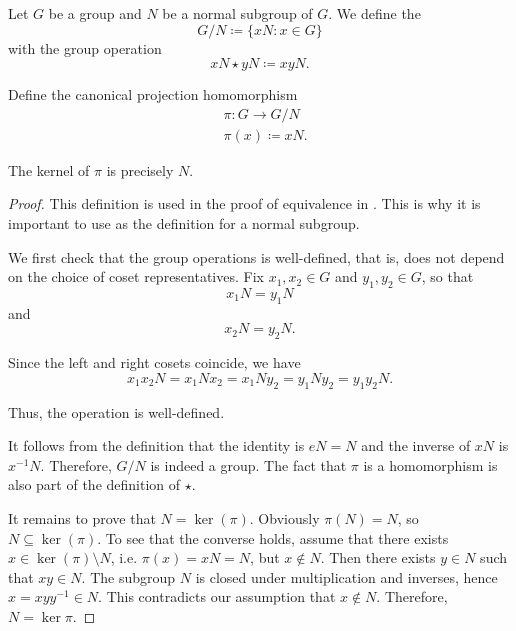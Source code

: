 \begin{definition}\label{def:quotient_group}
  Let \( G \) be a group and \( N \) be a normal subgroup of \( G \). We define the 
  \begin{equation*}
    G / N \coloneqq \{ x N \colon x \in G \}
  \end{equation*}
  with the group operation
  \begin{equation*}
    x N \star y N \coloneqq xy N.
  \end{equation*}

  Define the canonical projection homomorphism
  \begin{align*}
    &\pi: G \to G / N \\
    &\pi(x) \coloneqq x N.
  \end{align*}

  The kernel of \( \pi \) is precisely \( N \).
\end{definition}
\begin{proof}
  This definition is used in the proof of equivalence in . This is why it is important to use  as the definition for a normal subgroup.

  We first check that the group operations is well-defined, that is, does not depend on the choice of coset representatives. Fix \( x_1, x_2 \in G \) and \( y_1, y_2 \in G \), so that
  \begin{equation*}
    x_1 N = y_1 N
  \end{equation*}
  and
  \begin{equation*}
    x_2 N = y_2 N.
  \end{equation*}

  Since the left and right cosets coincide, we have
  \begin{equation*}
    x_1 x_2 N = x_1 N x_2 = x_1 N y_2 = y_1 N y_2 = y_1 y_2 N.
  \end{equation*}

  Thus, the operation is well-defined.

  It follows from the definition that the identity is \( e N = N \) and the inverse of \( x N \) is \( x^{-1} N \). Therefore, \( G / N \) is indeed a group. The fact that \( \pi \) is a homomorphism is also part of the definition of \( \star \).

  It remains to prove that \( N = \ker(\pi) \). Obviously \( \pi(N) = N \), so \( N \subseteq \ker(\pi) \). To see that the converse holds, assume that there exists \( x \in \ker(\pi) \setminus N \), i.e. \( \pi(x) = xN = N \), but \( x \not\in N \). Then there exists \( y \in N \) such that \( xy \in N \). The subgroup \( N \) is closed under multiplication and inverses, hence \( x = xyy^{-1} \in N \). This contradicts our assumption that \( x \not\in N \). Therefore, \( N = \ker \pi \).
\end{proof}

